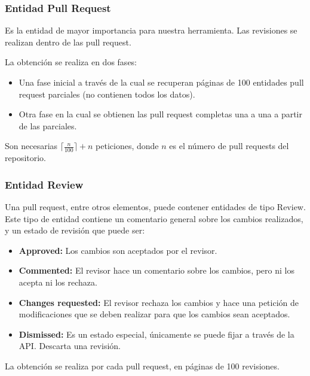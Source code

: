 \subsubsection{Entidad Pull Request}

Es la entidad de mayor importancia para nuestra herramienta. Las revisiones se realizan dentro de las pull request.

La obtención se realiza en dos fases:

\begin{itemize}
\item Una fase inicial a través de la cual se recuperan páginas de 100 entidades pull request parciales (no contienen todos los datos).
\item Otra fase en la cual se obtienen las pull request completas una a una a partir de las parciales.
\end{itemize}


Son necesarias $\lceil\frac{n}{100}\rceil + n$ peticiones, donde $n$ es el número de pull requests del repositorio.

\subsubsection{Entidad Review}

Una pull request, entre otros elementos, puede contener entidades de tipo Review. Este tipo de entidad contiene un comentario general sobre los cambios realizados, y un estado de revisión que puede ser:

\begin{itemize}
\tightlist
	\item \textbf{Approved:} Los cambios son aceptados por el revisor.
	\item \textbf{Commented:} El revisor hace un comentario sobre los cambios, pero ni los acepta ni los rechaza.
	\item \textbf{Changes requested:} El revisor rechaza los cambios y hace una petición de modificaciones que se deben realizar para que los cambios sean aceptados.
	\item \textbf{Dismissed:} Es un estado especial, únicamente se puede fijar a través de la API. Descarta una revisión.
\end{itemize}

La obtención se realiza por cada pull request, en páginas de 100 revisiones.


